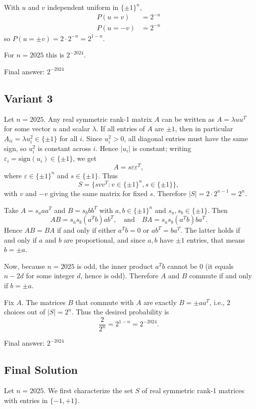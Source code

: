 \documentclass[12pt,a4paper]{article}
\theoremstyle{definition}
\begin{document}
    With $u$ and $v$ independent uniform in $\{\pm 1\}^n$,
    \begin{align}
        P(u = v) &= 2^{-n}\\
        P(u = -v) &= 2^{-n}
    \end{align}
    so $P(u = \pm v) = 2 \cdot 2^{-n} = 2^{1-n}$.

    For $n = 2025$ this is $2^{-2024}$.

    Final answer: $2^{-2024}$

    \subsection{Variant 3}
    Let $n = 2025$. Any real symmetric rank-1 matrix $A$ can be written as $A = \lambda uu^T$ for some vector $u$ and scalar $\lambda$. If all entries of $A$ are $\pm 1$, then in particular $A_{ii} = \lambda u_i^2 \in \{\pm 1\}$ for all $i$. Since $u_i^2 > 0$, all diagonal entries must have the same sign, so $u_i^2$ is constant across $i$. Hence $|u_i|$ is constant; writing $\varepsilon_i = \text{sign}(u_i) \in \{\pm 1\}$, we get
    \[A = s \varepsilon \varepsilon^T,\]
    where $\varepsilon \in \{\pm 1\}^n$ and $s \in \{\pm 1\}$. Thus
    \[S = \{ s v v^T : v \in \{\pm 1\}^n, s \in \{\pm 1\} \},\]
    with $v$ and $-v$ giving the same matrix for fixed $s$. Therefore $|S| = 2 \cdot 2^{n-1} = 2^n$.

    Take $A = s_a a a^T$ and $B = s_b b b^T$ with $a,b \in \{\pm 1\}^n$ and $s_a,s_b \in \{\pm 1\}$. Then
    \[AB = s_as_b (a^T b) a b^T, \quad \text{and} \quad BA = s_as_b (a^T b) b a^T.\]
    Hence $AB = BA$ if and only if either $a^T b = 0$ or $a b^T = b a^T$. The latter holds if and only if $a$ and $b$ are proportional, and since $a,b$ have $\pm 1$ entries, that means $b = \pm a$.

    Now, because $n = 2025$ is odd, the inner product $a^T b$ cannot be $0$ (it equals $n - 2d$ for some integer $d$, hence is odd). Therefore $A$ and $B$ commute if and only if $b = \pm a$.

    Fix $A$. The matrices $B$ that commute with $A$ are exactly $B = \pm a a^T$, i.e., $2$ choices out of $|S| = 2^n$. Thus the desired probability is
    \[\frac{2}{2^n} = 2^{1-n} = 2^{-2024}.\]

    Final answer: $2^{-2024}$

    \subsection{Final Solution}
    Let $n = 2025$. We first characterize the set $S$ of real symmetric rank-1 matrices with entries in $\{-1, +1\}$.
\end{document}
